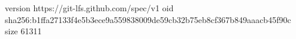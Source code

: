 version https://git-lfs.github.com/spec/v1
oid sha256:b1ffa27133f4e5b3ece9a559838009de59cb32b75eb8cf367b849aaacb45f90c
size 61311
